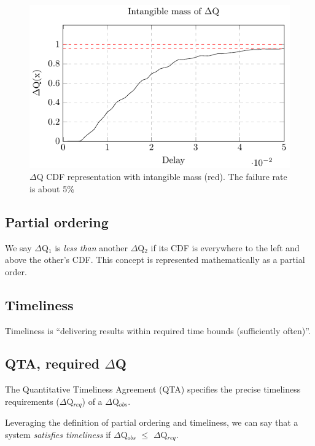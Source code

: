     \begin{figure}[H]
        \begin{center}
            \includegraphics{tikz/intangible.pdf}
        \end{center}
        \caption{$\Delta$Q CDF representation with intangible mass (red). The failure rate is about 5\% }
        \label{fig:int_mass}
    \end{figure}

    \subsection{Partial ordering}
        We say $\Delta$Q$_1$ is \textit{less than} another $\Delta$Q$_2$ if its CDF is everywhere to the left and above the other's CDF. This concept is represented mathematically as a partial order. \cite{dq-tut} 

    \subsection{Timeliness}
        Timeliness is ``delivering results within required time bounds (sufficiently often)''. \cite{dq-tut}
       
    \subsection{QTA, required $\Delta$Q}
        The Quantitative Timeliness Agreement (QTA) specifies the precise timeliness requirements ($\Delta$Q$_{req}$) of a $\Delta$Q$_{obs}$. \cite{dq-br} \cite{art}

     Leveraging the definition of partial ordering and timeliness, we can say that a system \textit{satisfies timeliness} if $\Delta$Q$_{obs}$ $\le$ $\Delta$Q$_{req}$. \cite{art} 
    
